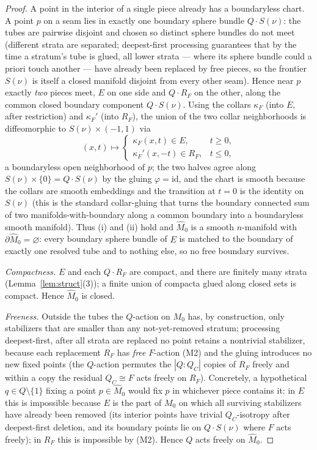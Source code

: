 \documentclass[12pt]{article}
\theoremstyle{definition}
\begin{document}
\begin{proof}
A point in the interior of a single piece already has a boundaryless chart. A
point $p$ on a seam lies in exactly one boundary sphere bundle $Q\cdot S(\nu)$:
the tubes are pairwise disjoint and chosen so distinct sphere bundles do not
meet (different strata are separated; deepest-first processing guarantees that by
the time a stratum's tube is glued, all lower strata --- where its sphere bundle
could a priori touch another --- have already been replaced by free pieces, so
the frontier $S(\nu)$ is itself a closed manifold disjoint from every other
seam). Hence near $p$ exactly \emph{two} pieces meet, $E$ on one side and
$Q\cdot R_F$ on the other, along the common closed boundary component
$Q\cdot S(\nu)$. Using the collars $\kappa_F$ (into $E$, after restriction) and
$\kappa_F'$ (into $R_F$), the union of the two collar neighborhoods is
diffeomorphic to $S(\nu)\times(-1,1)$ via
\[
   (x,t)\longmapsto
   \begin{cases}\kappa_F(x,t)\in E, & t\ge 0,\\[2pt]
                \kappa_F'(x,-t)\in R_F, & t\le 0,\end{cases}
\]
a boundaryless open neighborhood of $p$; the two halves agree along
$S(\nu)\times\{0\}=Q\cdot S(\nu)$ by the gluing $\varphi=\mathrm{id}$, and the
chart is smooth because the collars are smooth embeddings and the transition at
$t=0$ is the identity on $S(\nu)$ (this is the standard collar-gluing that turns
the boundary connected sum of two manifolds-with-boundary along a common
boundary into a boundaryless smooth manifold). Thus (i) and (ii) hold and
$\widehat M_0$ is a smooth $n$-manifold with $\partial\widehat M_0=\varnothing$:
every boundary sphere bundle of $E$ is matched to the boundary of exactly one
resolved tube and to nothing else, so no free boundary survives.

\emph{Compactness.} $E$ and each $Q\cdot R_F$ are compact, and there are
finitely many strata (Lemma~\ref{lem:struct}(3)); a finite union of compacta
glued along closed sets is compact. Hence $\widehat M_0$ is closed.

\emph{Freeness.} Outside the tubes the $Q$-action on $M_0$ has, by construction,
only stabilizers that are smaller than any not-yet-removed stratum; processing
deepest-first, after all strata are replaced no point retains a nontrivial
stabilizer, because each replacement $R_F$ has \emph{free} $F$-action (M2) and
the gluing introduces no new fixed points (the $Q$-action permutes the $|Q:Q_C|$
copies of $R_F$ freely and within a copy the residual $Q_C\cong F$ acts freely on
$R_F$). Concretely, a hypothetical $q\in Q\setminus\{1\}$ fixing a point
$p\in\widehat M_0$ would fix $p$ in whichever piece contains it: in $E$ this is
impossible because $E$ is the part of $M_0$ on which all surviving stabilizers
have already been removed (its interior points have trivial $Q_C$-isotropy after
deepest-first deletion, and its boundary points lie on $Q\cdot S(\nu)$ where $F$
acts freely); in $R_F$ this is impossible by (M2). Hence $Q$ acts freely on
$\widehat M_0$.


\end{proof}
\end{document}
